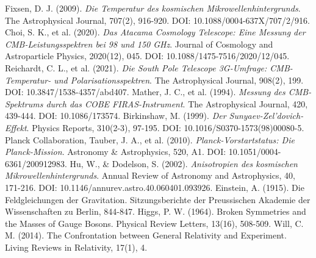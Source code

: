 \documentclass[12pt,a4paper]{article}
\begin{document}
\begin{thebibliography}{99}
		 Fixsen, D. J. (2009). \textit{Die Temperatur des kosmischen Mikrowellenhintergrunds}. The Astrophysical Journal, 707(2), 916-920. DOI: 10.1088/0004-637X/707/2/916.
		 Choi, S. K., et al. (2020). \textit{Das Atacama Cosmology Telescope: Eine Messung der CMB-Leistungsspektren bei 98 und 150 GHz}. Journal of Cosmology and Astroparticle Physics, 2020(12), 045. DOI: 10.1088/1475-7516/2020/12/045.
		 Reichardt, C. L., et al. (2021). \textit{Die South Pole Telescope 3G-Umfrage: CMB-Temperatur- und Polarisationsspektren}. The Astrophysical Journal, 908(2), 199. DOI: 10.3847/1538-4357/abd407.
		 Mather, J. C., et al. (1994). \textit{Messung des CMB-Spektrums durch das COBE FIRAS-Instrument}. The Astrophysical Journal, 420, 439-444. DOI: 10.1086/173574.
		 Birkinshaw, M. (1999). \textit{Der Sunyaev-Zel'dovich-Effekt}. Physics Reports, 310(2-3), 97-195. DOI: 10.1016/S0370-1573(98)00080-5.
		 Planck Collaboration, Tauber, J. A., et al. (2010). \textit{Planck-Vorstartstatus: Die Planck-Mission}. Astronomy \& Astrophysics, 520, A1. DOI: 10.1051/0004-6361/200912983.
		 Hu, W., \& Dodelson, S. (2002). \textit{Anisotropien des kosmischen Mikrowellenhintergrunds}. Annual Review of Astronomy and Astrophysics, 40, 171-216. DOI: 10.1146/annurev.astro.40.060401.093926.
		 Einstein, A. (1915). Die Feldgleichungen der Gravitation. Sitzungsberichte der Preussischen Akademie der Wissenschaften zu Berlin, 844-847.
		 Higgs, P. W. (1964). Broken Symmetries and the Masses of Gauge Bosons. Physical Review Letters, 13(16), 508-509.
		 Will, C. M. (2014). The Confrontation between General Relativity and Experiment. Living Reviews in Relativity, 17(1), 4.
	\end{thebibliography}
	
\end{document}
